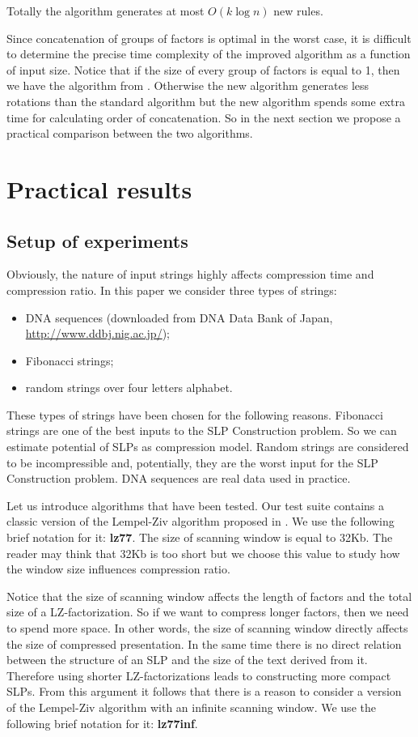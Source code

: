 ﻿\documentclass[10pt, conference, compsocconf]{IEEEtran}
\begin{document}
Totally the algorithm generates at most $O(k\log n)$ new rules.

Since concatenation of groups of factors is optimal in the worst case, it is
difficult to determine the precise time complexity of the improved algorithm as
a function of input size. Notice that if the size of every group of factors is
equal to 1, then we have the algorithm from \cite{SLPConstruction}. Otherwise
the new algorithm generates less rotations than the standard algorithm but the
new algorithm spends some extra time for calculating order of concatenation. So
in the next section we propose a practical comparison between the two
algorithms.

\section{Practical results}

\subsection{Setup of experiments}
Obviously, the nature of input strings highly affects compression
time and compression ratio. In this paper we consider three types of strings:

\begin{itemize}
  \item DNA sequences (downloaded from DNA Data Bank of Japan, \url{http://www.ddbj.nig.ac.jp/});
  \item Fibonacci strings;
  \item random strings over four letters alphabet.
\end{itemize}

These types of strings have been chosen for the following reasons. Fibonacci
strings are one of the best inputs to the SLP Construction problem. So we can
estimate potential of SLPs as compression model. Random strings are considered
to be incompressible and, potentially, they are the worst input for the SLP
Construction problem. DNA sequences are real data used in practice.

Let us introduce algorithms that have been tested. Our test suite contains a
classic version of the Lempel-Ziv algorithm proposed in \cite{LZ77}. We use the
following brief notation for it: \textbf{lz77}. The size of scanning window is
equal to 32Kb. The reader may think that 32Kb is too short but we choose this
value to study how the window size influences compression ratio.

Notice that the size of scanning window affects the length of factors and the
total size of a LZ-factorization. So if we want to compress longer factors,
then we need to spend more space. In other words, the size of scanning window
directly affects the size of compressed presentation. In the same time there is
no direct relation between the structure of an SLP and the size of the text
derived from it. Therefore using shorter LZ-factorizations leads to
constructing more compact SLPs. From this argument it follows that there is a
reason to consider a version of the Lempel-Ziv algorithm with an infinite
scanning window. We use the following brief notation for it: \textbf{lz77inf}.
\end{document}
